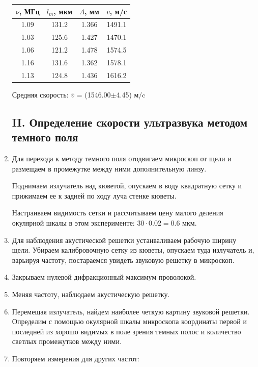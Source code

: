 \documentclass[a4paper,12pt]{article}
\begin{document}
\begin{enumerate}
    \begin{table}[h!]
    \centering
    \begin{tabular}{||c|c|c|c||}
    \hline
        $\nu$, МГц & $l_m$, мкм & $\Lambda$, мм & $v$, м/с \\
        \hline
        1.09 & 131.2 & 1.366 & 1491.1 \\ 
        1.03 & 125.6 & 1.427 & 1470.1 \\
        1.06 & 121.2 & 1.478 & 1574.5 \\
        1.16 & 131.6 & 1.362 & 1578.1 \\
        1.13 & 124.8 & 1.436 & 1616.2 \\
        \hline
    \end{tabular}
    \end{table}

    Средняя скорость: $\overline{v}$ = (1546.00$\pm$4.45) м/c

    \subsection{II. Определение скорости ультразвука методом темного поля}

    \item Для перехода к методу темного поля отодвигаем микроскоп от щели и размещаем в промежутке между ними дополнительную линзу.

    Поднимаем излучатель над кюветой, опускаем в воду квадратную сетку и прижимаем ее к задней по ходу луча стенке кюветы.

    Настраиваем видимость сетки и рассчитываем цену малого деления окулярной шкалы в этом эксперименте:  $30 \cdot 0.02 = 0.6$ мкм.
    \item Для наблюдения акустической решетки устанваливаем рабочую ширину щели. Убираем калибровочную сетку из кюветы, опускаем туда излучатель и, варьируя частоту, постараемся увидеть звуковую решетку в микроскоп. 
    \item Закрываем нулевой дифракционный максимум проволокой.
    \item Меняя частоту, наблюдаем акустическую решетку.
    \item Перемещая излучатель, найдем наиболее четкую картину звуковой решетки. Определим с помощью окулярной шкалы микроскопа координаты первой и последней из хорошо видимых в поле зрения темных полос и количество светлых промежутков между ними.
    \item Повторяем измерения для других частот:


\end{enumerate}
\end{document}
